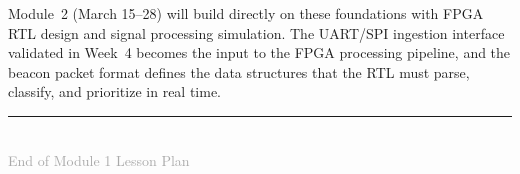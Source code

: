 \documentclass[11pt,letterpaper]{article}
\begin{document}
	Module~2 (March 15--28) will build directly on these foundations with FPGA RTL design and signal processing simulation. The UART/SPI ingestion interface validated in Week~4 becomes the input to the FPGA processing pipeline, and the beacon packet format defines the data structures that the RTL must parse, classify, and prioritize in real time.
	
	\vfill
	\begin{center}
		\rule{0.5\textwidth}{0.4pt}\\[6pt]
		{\small\textcolor{darkgray}{End of Module 1 Lesson Plan}}
	\end{center}
	
\end{document}
